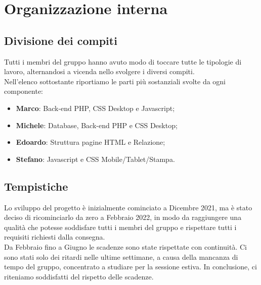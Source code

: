 \section{Organizzazione interna}
    \subsection{Divisione dei compiti}
    Tutti i membri del gruppo hanno avuto modo di toccare tutte le tipologie di lavoro, alternandosi a vicenda nello svolgere i diversi compiti.\\
    Nell'elenco sottostante riportiamo le parti più sostanziali svolte da ogni componente:
    \begin{itemize}
        \item \textbf{Marco}: Back-end PHP, CSS Desktop e Javascript;
        \item \textbf{Michele}: Database, Back-end PHP e CSS Desktop;
        \item \textbf{Edoardo}: Struttura pagine HTML e Relazione;
        \item \textbf{Stefano}: Javascript e CSS Mobile/Tablet/Stampa.
    \end{itemize}
    
    \subsection{Tempistiche}
    Lo sviluppo del progetto è inizialmente cominciato a Dicembre 2021, ma è stato deciso di ricominciarlo da zero a Febbraio 2022, in modo da raggiungere una qualità che potesse soddisfare tutti i membri del gruppo e rispettare tutti i requisiti richiesti dalla consegna.\\
    Da Febbraio fino a Giugno le scadenze sono state rispettate con continuità. Ci sono stati solo dei ritardi nelle ultime settimane, a causa della mancanza di tempo del gruppo, concentrato a studiare per la sessione estiva.
    In conclusione, ci riteniamo soddisfatti del rispetto delle scadenze.
